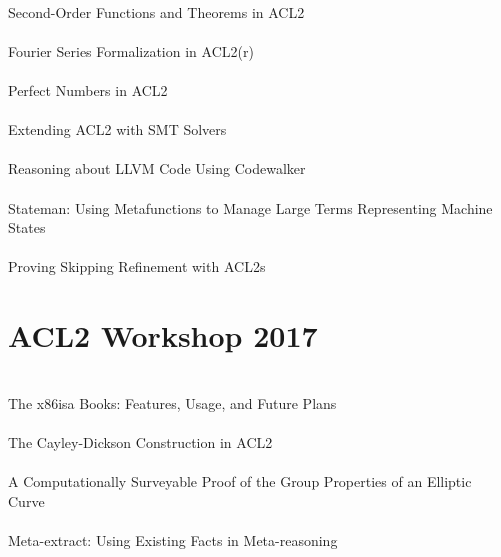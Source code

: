 \documentclass{article}
\begin{document}
\cite{15-coglio-soft} \\
Second-Order Functions and Theorems in {ACL2} \\

\cite{15-chau-fourier} \\
{Fourier} Series Formalization in {ACL2(r)} \\

\cite{15-cowles-perfect} \\
Perfect Numbers in {ACL2} \\

\cite{15-peng-smt} \\
Extending {ACL2} with {SMT} Solvers \\

\cite{15-hardin-llvm} \\
Reasoning about {LLVM} Code Using {Codewalker} \\

\cite{15-moore-stateman} \\
{Stateman}: Using Metafunctions to Manage Large Terms Representing Machine States \\

\cite{15-jain-refinement} \\
Proving Skipping Refinement with {ACL2s} \\


\section{ACL2 Workshop 2017}

\cite{17-goel-x86isa} \\
The {x86isa} Books: Features, Usage, and Future Plans \\

\cite{17-cowles-construction} \\
The {Cayley-Dickson} Construction in {ACL2} \\

\cite{17-russinoff-surveyable} \\
A Computationally Surveyable Proof of the Group Properties of an Elliptic Curve \\

\cite{17-kaufmann-meta} \\
Meta-extract: Using Existing Facts in Meta-reasoning \\
\end{document}
